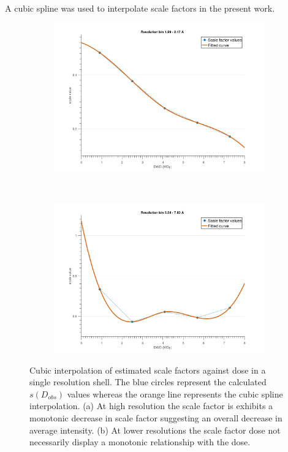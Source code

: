 A cubic spline was used to interpolate scale factors in the present work.
\begin{figure}
        \centering
        \begin{subfigure}[b]{1\textwidth}
                \centering
                \includegraphics[width=\textwidth]{figures/zde/scale_fit_bin9.pdf}
                \caption{}
                \label{fig:monotonic scale factor - Extrapolation method}
        \end{subfigure}
				\\
        \begin{subfigure}[b]{1\textwidth}
                \centering
                \includegraphics[width=\textwidth]{figures/zde/scale_fit_bin2.pdf}
                \caption{}
                \label{fig:scale factor not monotonic - Extrapolation method}
        \end{subfigure}
        \caption{Cubic interpolation of estimated scale factors against dose in a single resolution shell.
        The blue circles represent the calculated $s(D_{obs})$ values whereas the orange line represents the cubic spline interpolation.
        (a) At high resolution the scale factor is exhibits a monotonic decrease in scale factor suggesting an overall decrease in average intensity.
        (b) At lower resolutions the scale factor dose not necessarily display a monotonic relationship with the dose.}
        \label{fig:Scale factors, cubic interpolation - Extrapolation method}
\end{figure}

